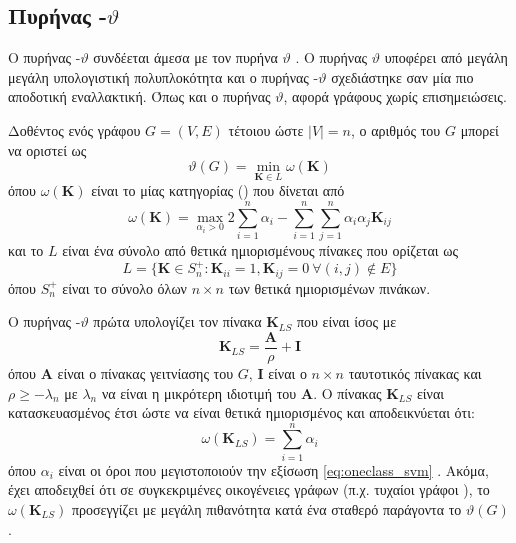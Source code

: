 \subsection{Πυρήνας -$\vartheta$}
\label{ssec:svm_k}
Ο πυρήνας -$\vartheta$ συνδέεται άμεσα με τον πυρήνα  $\vartheta$ \cite{johansson2014global}.
Ο πυρήνας  $\vartheta$ υποφέρει από μεγάλη μεγάλη υπολογιστική πολυπλοκότητα και ο πυρήνας -$\vartheta$ σχεδιάστηκε σαν μία πιο αποδοτική εναλλακτική. 
Όπως και ο πυρήνας  $\vartheta$, αφορά γράφους χωρίς επισημειώσεις.

Δοθέντος ενός γράφου $G=(V,E)$ τέτοιου ώστε $|V| = n$, ο αριθμός  του $G$ μπορεί να οριστεί ως
\begin{equation}
    \vartheta(G) = \min_{\mathbf{K} \in L} \omega(\mathbf{K})
\end{equation}
όπου $\omega(\mathbf{K})$ είναι το  μίας κατηγορίας () που δίνεται από
\begin{equation}
    \label{eq:oneclass_svm}
    \omega(\mathbf{K}) = \max_{\alpha_i > 0} 2\sum_{i=1}^{n} \alpha_i - \sum_{i=1}^{n} \sum_{j=1}^{n} \alpha_i \alpha_j \mathbf{K}_{ij}
\end{equation}
και το $L$ είναι ένα σύνολο από θετικά ημιορισμένους πίνακες που ορίζεται ως
\begin{equation}
    L = \{ \mathbf{K} \in S_{n}^+ : \mathbf{K}_{ii} = 1, \mathbf{K}_{ij}=0 \: \forall (i,j) \not \in E \}
\end{equation}
όπου $S_{n}^+$ είναι το σύνολο όλων $n \times n$ των θετικά ημιορισμένων πινάκων.

Ο πυρήνας -$\vartheta$ πρώτα υπολογίζει τον πίνακα $\mathbf{K}_{LS}$ που είναι ίσος με
\begin{equation}
    \mathbf{K}_{LS} = \frac{\mathbf{A}}{\rho} + \mathbf{I}
\end{equation}
όπου $\mathbf{A}$ είναι ο πίνακας γειτνίασης του $G$, $\mathbf{I}$ είναι ο $n \times n$ ταυτοτικός πίνακας και $\rho \geq -\lambda_n$ με $\lambda_n$ να είναι η μικρότερη ιδιοτιμή του $\mathbf{A}$.
Ο πίνακας $\mathbf{K}_{LS}$ είναι κατασκευασμένος έτσι ώστε να είναι θετικά ημιορισμένος και αποδεικνύεται ότι: 
\begin{equation}
    \omega(\mathbf{K}_{LS}) = \sum_{i=1}^n \alpha_i
\end{equation}
όπου $\alpha_i$ είναι οι όροι που μεγιστοποιούν την εξίσωση \ref{eq:oneclass_svm} \cite{jethava2013lovasz}.
Ακόμα, έχει αποδειχθεί ότι σε συγκεκριμένες οικογένειες γράφων (π.χ. τυχαίοι γράφοι ), το  $\omega(\mathbf{K}_{LS})$ προσεγγίζει με μεγάλη πιθανότητα κατά ένα σταθερό παράγοντα το $\vartheta(G)$.

